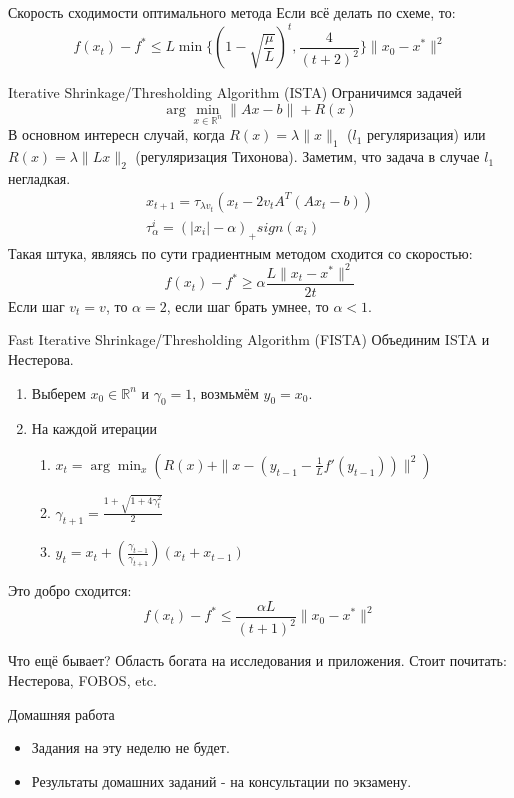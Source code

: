 \documentclass[14pt, fleqn, xcolor={dvipsnames, table}]{beamer}
\begin{document}
\begin{frame}{Скорость сходимости оптимального метода}
Если всё делать по схеме, то:
$$
f(x_t) - f^* \le L\min\{(1-\sqrt{\frac{\mu}{L}})^t, \frac{4}{(t+2)^2}\}\|x_0-x^*\|^2
$$
\end{frame}

\begin{frame}{Iterative Shrinkage/Thresholding Algorithm (ISTA)}
\small
Ограничимся задачей
$$
\arg\min_{x \in \mathbb{R}^n}\|Ax - b\| + R(x)
$$
В основном интересн случай, когда $R(x) = \lambda \|x\|_1$ ($l_1$ регуляризация) или $R(x)=\lambda\|Lx\|_2$ (регуляризация Тихонова).
Заметим, что задача в случае $l_1$ негладкая.
$$\begin{array}{l}
x_{t+1} = \tau_{\lambda v_t}(x_t - 2v_tA^T(Ax_t - b)) \\
\tau_{\alpha}^i = (|x_i| - \alpha)_{+}sign(x_i)
\end{array}$$
Такая штука, являясь по сути градиентным методом сходится со скоростью:
$$
f(x_t) - f^* \ge \alpha \frac{L\|x_t - x^*\|^2}{2t}
$$
Если шаг $v_t = v$, то $\alpha=2$, если шаг брать умнее, то $\alpha<1$.
\end{frame}

\begin{frame}{Fast Iterative Shrinkage/Thresholding Algorithm (FISTA)}
Объединим ISTA и Нестерова.
\begin{enumerate}
  \item Выберем $x_0 \in \mathbb{R}^n$ и $\gamma_0 = 1$, возмьмём $y_0=x_0$.
  \item На каждой итерации
  \begin{enumerate}
    \item $x_t = \arg\min_x(R(x) + \|x - (y_{t-1} - \frac{1}{L}f'(y_{t-1}))\|^2)$
    \item $\gamma_{t+1} = \frac{1 + \sqrt{1+4\gamma_t^2}}{2}$
    \item $y_t = x_t + (\frac{\gamma_{t-1}}{\gamma_{t+1}})(x_t + x_{t-1})$
  \end{enumerate}
\end{enumerate}
Это добро сходится:
$$
f(x_t) - f^* \le \frac{\alpha L}{(t+1)^2}\|x_0 - x^*\|^2
$$
\end{frame}

\begin{frame}{Что ещё бывает?}
Область богата на исследования и приложения. Стоит почитать: Нестерова, FOBOS, etc.
\end{frame}



\begin{frame}{Домашняя работа}
\begin{itemize}
  \item Задания на эту неделю не будет.
  \item Результаты домашних заданий - на консультации по экзамену.
\end{itemize}
\end{frame}
\end{document}

